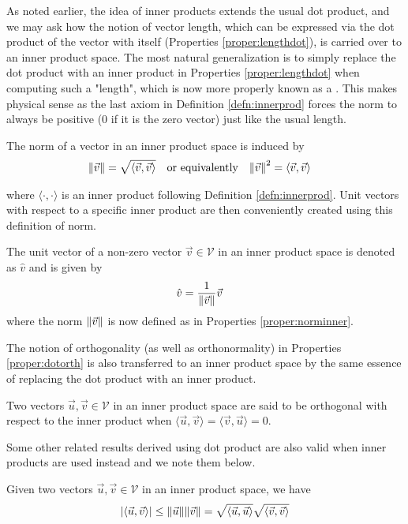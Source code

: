 As noted earlier, the idea of inner products extends the usual dot product, and we may ask how the notion of vector length, which can be expressed via the dot product of the vector with itself (Properties \ref{proper:lengthdot}), is carried over to an inner product space. The most natural generalization is to simply replace the dot product with an inner product in Properties \ref{proper:lengthdot} when computing such a "length", which is now more properly known as a . This makes physical sense as the last axiom in Definition \ref{defn:innerprod} forces the norm to always be positive ($0$ if it is the zero vector) just like the usual length.
\begin{proper}
\label{proper:norminner}
The norm of a vector in an inner product space is induced by
\begin{align}
\norm{\vec{v}} &= \sqrt{\langle\vec{v} , \vec{v}\rangle} & &\text{or equivalently} &
\norm{\vec{v}}^2 &= \langle\vec{v} , \vec{v}\rangle
\end{align}
\end{proper}
where $\langle \cdot, \cdot \rangle$ is an inner product following Definition \ref{defn:innerprod}.
Unit vectors with respect to a specific inner product are then conveniently created using this definition of norm.
\begin{defn}
\label{defn:unitvecinner}
The unit vector of a non-zero vector $\vec{v} \in \mathcal{V}$ in an inner product space is denoted as $\hat{v}$ and is given by
\begin{align}
\hat{v} &= \frac{1}{\norm{\vec{v}}}\vec{v}
\end{align}
where the norm $\norm{\vec{v}}$ is now defined as in Properties \ref{proper:norminner}. 
\end{defn}
The notion of orthogonality (as well as orthonormality) in Properties \ref{proper:dotorth} is also transferred to an inner product space by the same essence of replacing the dot product with an inner product.
\begin{proper}
\label{proper:orthoinner}
Two vectors $\vec{u}, \vec{v} \in \mathcal{V}$ in an inner product space are said to be orthogonal with respect to the inner product when $\langle\vec{u}, \vec{v}\rangle = \langle\vec{v}, \vec{u}\rangle = 0$.
\end{proper}
Some other related results derived using dot product are also valid when inner products are used instead and we note them below.
\begin{thm}
\label{thm:cauchyschinner}
Given two vectors $\vec{u}, \vec{v} \in \mathcal{V}$ in an inner product space, we have
\begin{align}
\abs{\langle\vec{u} , \vec{v}\rangle} \leq \norm{\vec{u}}\norm{\vec{v}} =  \sqrt{\langle\vec{u} , \vec{u}\rangle} \sqrt{\langle\vec{v} , \vec{v}\rangle}
\end{align}
\end{thm}
